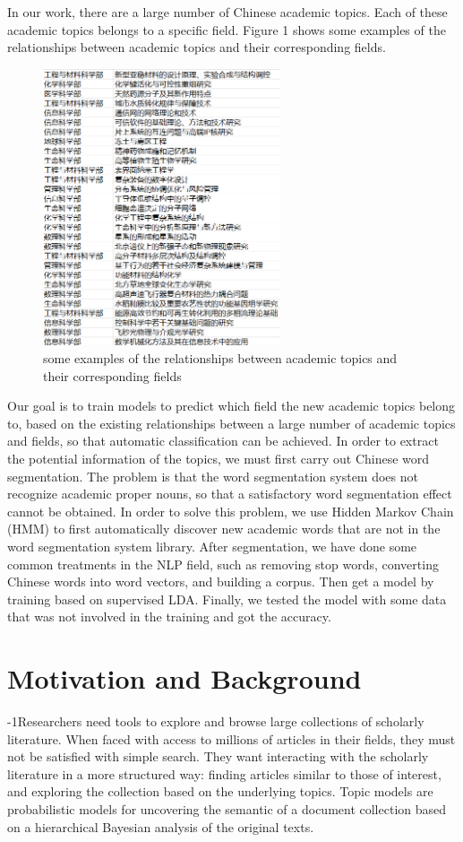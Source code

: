 \documentclass{acmtog} %
\begin{document}
In our work, there are a large number of Chinese academic topics. Each of these academic topics belongs to a specific field. Figure 1 shows some examples of the relationships between academic topics and their corresponding fields.




\begin{figure}[h]
\centerline{\includegraphics[width=7cm]{Figure 1.png}}
\caption{some examples of the relationships between academic topics and their corresponding fields}
  \label{fig:videocomparison}
\end{figure}

Our goal is to train models to predict which field the new academic topics belong to, based on the existing relationships between a large number of academic topics and fields, so that automatic classification can be achieved.
In order to extract the potential information of the topics, we must first carry out Chinese word segmentation. The problem is that the word segmentation system does not recognize academic proper nouns, so that a satisfactory word segmentation effect cannot be obtained. In order to solve this problem, we use Hidden Markov Chain (HMM) to first automatically discover new academic words that are not in the word segmentation system library.
After segmentation, we have done some common treatments in the NLP field, such as removing stop words, converting Chinese words into word vectors, and building a corpus. Then get a model by training based on supervised LDA.
Finally, we tested the model with some data that was not involved in the training and got the accuracy.


\section{Motivation and Background}
\label{sec:relatedwork}
%
\looseness-1Researchers need tools to explore and browse large collections of scholarly literature. When faced with access to millions of articles in their fields, they must not be satisfied with simple search. They want interacting with the scholarly literature in a more structured way: finding articles similar to those of interest, and exploring the collection based on the underlying topics. Topic models are probabilistic models for uncovering the semantic of a document collection based on a hierarchical Bayesian analysis of the original texts.
\end{document}
